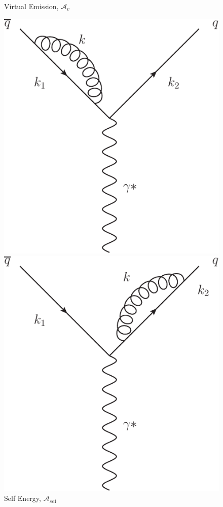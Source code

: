 \begin{figure}[tpb]
\begin{minipage}{0.4\linewidth}
				\caption{Virtual Emission, $\mathcal{A}_v$}
			\end{minipage}
			\begin{minipage}{0.4\linewidth}
				\centering
				\includegraphics[width=0.98\linewidth]{NLOSelfEnergyLeft}
				\caption{Self Energy, $\mathcal{A}_{se1}$}
			\end{minipage}
			\begin{minipage}{0.4\linewidth}
				\centering
				\includegraphics[width=0.98\linewidth]{NLOSelfEnergyRight}

\end{minipage}
\end{figure}
